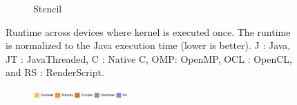 \begin{figure}
\begin{subfigure}[b]{0.33\textwidth}
      \caption{Stencil}
  \end{subfigure}
  \caption{Runtime across devices where kernel is executed once. The runtime is normalized to the Java execution time (lower is better). J : Java, JT : JavaThreaded, C : Native C, OMP: OpenMP, OCL : OpenCL, and RS : RenderScript.}
  \label{fig:perfOne}
\end{figure}

\begin{figure}

  \centering
  \begin{subfigure}[b]{\textwidth}
          \centering
          \includegraphics[width=0.4\textwidth]{data/legend.pdf}
  \end{subfigure}


\end{figure}
